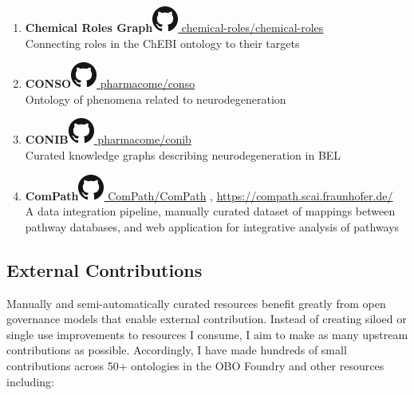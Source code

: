 \documentclass[10pt,a4paper,sans]{moderncv} %
\begin{document}
\begin{enumerate}
        \item \textbf{Chemical Roles Graph}\hfill\href{https://github.com/chemical-roles/chemical-roles}{\includegraphics[scale=0.25]{img/GitHub-Mark-32px} chemical-roles/chemical-roles}
\\
    Connecting roles in the ChEBI ontology to their targets

        \item \textbf{CONSO}\hfill\href{https://github.com/pharmacome/conso}{\includegraphics[scale=0.25]{img/GitHub-Mark-32px} pharmacome/conso}
\\
    Ontology of phenomena related to neurodegeneration

        \item \textbf{CONIB}\hfill\href{https://github.com/pharmacome/conib}{\includegraphics[scale=0.25]{img/GitHub-Mark-32px} pharmacome/conib}
\\
    Curated knowledge graphs describing neurodegeneration in BEL

        \item \textbf{ComPath}\hfill\href{https://github.com/ComPath/ComPath}{\includegraphics[scale=0.25]{img/GitHub-Mark-32px} ComPath/ComPath}
, \url{https://compath.scai.fraunhofer.de/}\\
    A data integration pipeline, manually curated dataset of mappings between pathway databases, and web application for integrative analysis of pathways

    \end{enumerate}

    \subsection{External Contributions}\label{sec:contributions}

    Manually and semi-automatically curated resources benefit greatly
    from open governance models that enable external contribution. Instead
    of creating siloed or single use improvements to resources I consume,
    I aim to make as many upstream contributions as possible. Accordingly,
    I have made hundreds of small contributions across 50+ ontologies
    in the OBO Foundry and other resources including:
\end{document}
